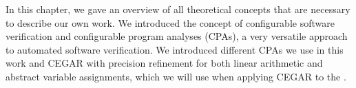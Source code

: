 In this chapter, we gave an overview of all theoretical concepts that are necessary to describe our own work. We introduced the concept of configurable software verification and configurable program analyses (CPAs), a very versatile approach to automated software verification. We introduced different CPAs we use in this work and CEGAR with precision refinement for both linear arithmetic and abstract variable assignments, which we will use when applying CEGAR to the \symbolicExecutionCPA.
